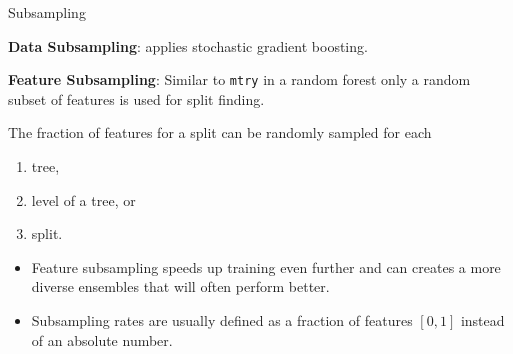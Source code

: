 \begin{vbframe}{Subsampling}

  \textbf{Data Subsampling}:  applies stochastic gradient boosting.

  \lz

  \textbf{Feature Subsampling}: Similar to \texttt{mtry} in a random forest only a random subset of features is used for split finding.

  \lz

  The fraction of features for a split can be randomly sampled for each
  \begin{enumerate}
    \item tree,
    \item level of a tree, or
    \item split.
  \end{enumerate}

  \lz

  \begin{itemize}
    \item Feature subsampling speeds up training even further and can creates a more diverse ensembles that will often perform better.
    \item Subsampling rates are usually defined as a fraction of features $[0,1]$ instead of an absolute number.
  \end{itemize}


  \end{vbframe}


